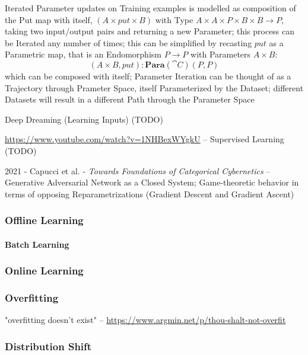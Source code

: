 Iterated Parameter updates on Training examples is modelled as composition of
the Put map with itself, $(A \times put \times B)$ with Type
$A \times A \times P \times B \times B \to P$, taking two input/output pairs and
returning a new Parameter; this process can be Iterated any number of times;
this can be simplified by recasting $put$ as a Parametric map, that is an
Endomorphism $P \to P$ with Parameters $A \times B$:
\[
  (A \times B, put) : \mathbf{Para}(\cat{C})(P,P)
\]
which can be composed with itself; Parameter Iteration can be thought of as a
Trajectory through Prameter Space, itself Parameterized by the Dataset;
different Datasets will result in a different Path through the Parameter Space

Deep Dreaming (Learning Inputs) (TODO)

\url{https://www.youtube.com/watch?v=1NHBexWYgkU}
-- Supervised Learning (TODO)

2021 - Capucci et al. - \emph{Towards Foundations of Categorical Cybernetics} --
Generative Adversarial Network as a Closed System; Game-theoretic behavior in
terms of opposing Reparametrizations (Gradient Descent and Gradient Ascent)



\subsubsection{Offline Learning}\label{sec:offline_learning}

\paragraph{Batch Learning}\label{sec:batch_learning}\hfill



\subsubsection{Online Learning}\label{sec:online_learning}

\subsubsection{Overfitting}\label{sec:overfitting}

"overfitting doesn't exist" --
\url{https://www.argmin.net/p/thou-shalt-not-overfit}



\subsubsection{Distribution Shift}\label{sec:distribution_shift}

